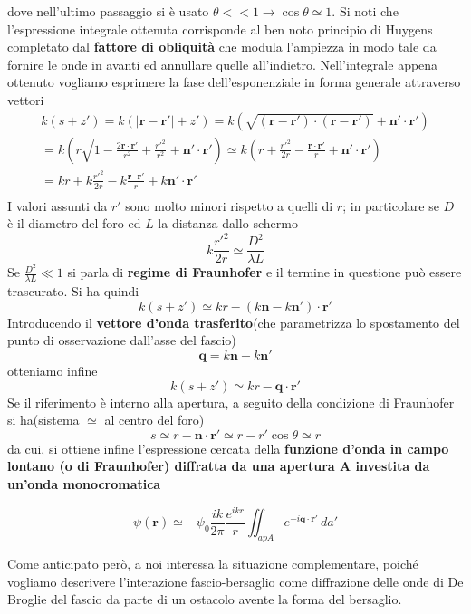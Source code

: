 dove nell'ultimo passaggio si è usato
\(\theta << 1 \rightarrow \cos \theta \simeq 1\). Si noti che
l'espressione integrale ottenuta corrisponde al ben noto principio di
Huygens completato dal \textbf{fattore di obliquità} che modula
l'ampiezza in modo tale da fornire le onde in avanti ed annullare quelle
all'indietro.
Nell'integrale appena ottenuto vogliamo esprimere la fase dell'esponenziale in forma generale attraverso vettori \begin{gather*}
	k(s + z') = k(|\bm{r}-\bm{r'}|+z') = k \left(\sqrt{(\bm{r}-\bm{r'})\cdot(\bm{r}-\bm{r'})}+\bm{n}' \cdot \bm{r'}\right)\\
	= k\left(r \sqrt{1 - \frac{2 \bm{r}\cdot \bm{r'}}{r^2} + \frac{r'^2}{r^2}} + \bm{n}' \cdot \bm{r'}\right) \simeq k\left( r + \frac{r'^2}{2r} - \frac{ \bm{r}\cdot \bm{r'}}{r} + \bm{n}' \cdot \bm{r'}\right)\\
	= k r + k \frac{r'^2}{2r} - k \frac{ \bm{r}\cdot \bm{r'}}{r} + k \bm{n}' \cdot \bm{r'}\\
\end{gather*}
I valori assunti da \(r'\) sono molto minori rispetto a quelli di
\(r\); in particolare se \(D\) è il diametro del foro ed \(L\) la
distanza dallo schermo
\[
	k \frac{r'^2}{2r} \simeq \frac{D^2}{\lambda L}
\]
Se \(\frac{D^2}{\lambda L} \ll 1\) si parla di \textbf{regime di
Fraunhofer} e il termine in questione può essere trascurato. Si ha
quindi \[
		   k(s+z') \simeq kr - (k \bm{n} - k \bm{n}') \cdot \bm{r}'
\] Introducendo il \textbf{vettore d'onda trasferito}(che parametrizza
lo spostamento del punto di osservazione dall'asse del fascio) \[
																   \bm{q} = k \bm{n} - k \bm{n}'
\] otteniamo infine \[
						k(s+ z') \simeq kr - \bm{q} \cdot \bm{r}'
\] Se il riferimento è interno alla apertura, a seguito della condizione
di Fraunhofer si ha(sistema \(\simeq\) al centro del foro) \[
															   s \simeq r - \bm{n} \cdot \bm{r'} \simeq r - r' \cos \theta \simeq r
\]
da cui, si ottiene infine l'espressione cercata della \textbf{funzione
d'onda in campo lontano (o di Fraunhofer) diffratta da una apertura A
investita da un'onda monocromatica}

\begin{equation}
	\psi(\bm{r}) \simeq - \psi_0 \frac{ik}{2 \pi} \frac{e^{ikr}}{r}
	\iint_{ap A} e^{-i \bm{q} \cdot \bm{r}'}\, da'
\end{equation}

Come anticipato però, a noi interessa la situazione complementare,
poiché vogliamo descrivere l'interazione fascio-bersaglio come
diffrazione delle onde di De Broglie del fascio da parte di un ostacolo
avente la forma del bersaglio.

